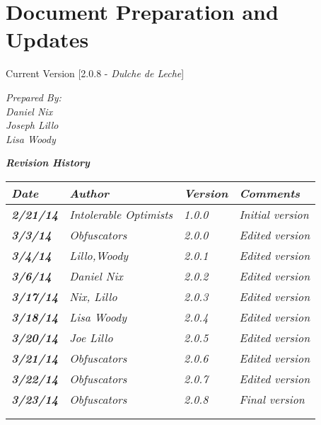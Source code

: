 
\chapter{Document Preparation and Updates}

Current Version [2.0.8 - \textit{Dulche de Leche}] 
\vspace*{5mm}

{\color{MSBlue3}
\noindent
\textit{Prepared By:}\\
\textit{Daniel Nix}\\
\textit{Joseph Lillo}\\
\textit{Lisa Woody}
}

\vfill
\noindent
{\color{color02} \textit{\textbf{Revision History}}}\\
\begin{tabular}{|>{\raggedright}p{1.5cm}|>{\raggedright}p{3cm}|>{\raggedright}p{1.5cm}|>{\raggedright}p{9cm}|}
\hline
\textit{\textbf{Date}} &  \textit{\textbf{Author}} & \textit{\textbf{Version}} & \textit{\textbf{Comments}}\tabularnewline
\hline
 \textit{\textbf{2/21/14}} & \textit{Intolerable Optimists} & \textit{1.0.0} & \textit{Initial version}\tabularnewline
\hline
 \textit{\textbf{3/3/14}} & \textit{Obfuscators} & \textit{2.0.0} & \textit{Edited version}\tabularnewline
\hline
 \textit{\textbf{3/4/14}} & \textit{Lillo,Woody} & \textit{2.0.1} & \textit{Edited version}\tabularnewline
\hline
\textit{\textbf{3/6/14}} & \textit{Daniel Nix} & \textit{2.0.2} & \textit{Edited version}\tabularnewline
\hline
 \textit{\textbf{3/17/14}} & \textit{Nix, Lillo} & \textit{2.0.3} & \textit{Edited version}\tabularnewline
 \hline
 \textit{\textbf{3/18/14}} & \textit{Lisa Woody} & \textit{2.0.4} & \textit{Edited version}\tabularnewline
 \hline
 \textit{\textbf{3/20/14}} & \textit{Joe Lillo} & \textit{2.0.5} & \textit{Edited version}\tabularnewline
 \hline
 \textit{\textbf{3/21/14}} & \textit{Obfuscators} & \textit{2.0.6} & \textit{Edited version}\tabularnewline
 \hline
 \textit{\textbf{3/22/14}} & \textit{Obfuscators} & \textit{2.0.7} & \textit{Edited version}\tabularnewline
\hline
 \textit{\textbf{3/23/14}} & \textit{Obfuscators} & \textit{2.0.8} & \textit{Final version}\tabularnewline
\hline
 &  &  & \tabularnewline
\hline
 &  &  & \tabularnewline
\hline
\end{tabular}
\vfill

